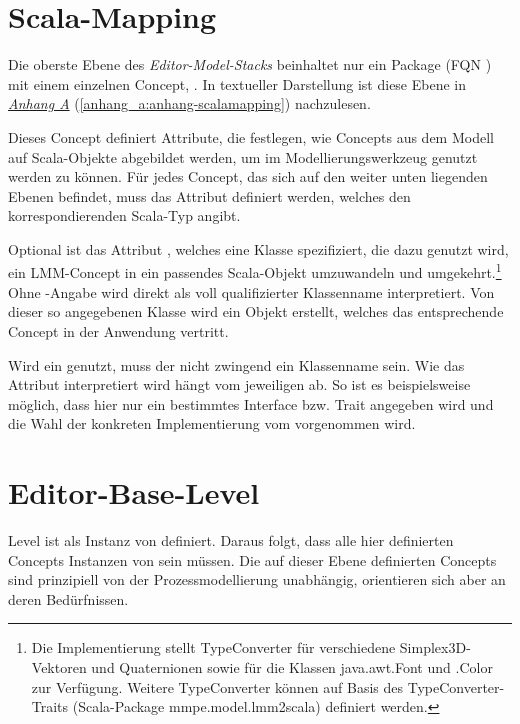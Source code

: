 \documentclass[a4paper,10pt]{sphinxmanual}
\begin{document}
\section{Scala-Mapping}
\label{metamodelle:scalamapping}\label{metamodelle:scala-mapping}
Die oberste Ebene des \emph{Editor-Model-Stacks} beinhaltet nur ein Package  (FQN ) mit einem einzelnen Concept, .
In textueller Darstellung ist diese Ebene in {\hyperref[anhang_a:anhang-scalamapping]{\emph{Anhang A}}} (\autoref*{anhang_a:anhang-scalamapping}) nachzulesen.

Dieses Concept definiert Attribute, die festlegen, wie Concepts aus dem Modell auf Scala-Objekte abgebildet werden, um im Modellierungswerkzeug genutzt werden zu können.
Für jedes Concept, das sich auf den weiter unten liegenden Ebenen befindet, muss das Attribut  definiert werden, welches den korrespondierenden Scala-Typ angibt.

Optional ist das Attribut , welches eine Klasse spezifiziert, die dazu genutzt wird, ein LMM-Concept in ein passendes Scala-Objekt umzuwandeln und umgekehrt.\footnote{
Die Implementierung stellt TypeConverter für verschiedene Simplex3D-Vektoren und Quaternionen sowie für die Klassen java.awt.Font und .Color zur Verfügung. Weitere TypeConverter können auf Basis des TypeConverter-Traits (Scala-Package mmpe.model.lmm2scala) definiert werden.
}
Ohne -Angabe wird  direkt als voll qualifizierter Klassenname interpretiert.
Von dieser so angegebenen Klasse wird ein Objekt erstellt, welches das entsprechende Concept in der Anwendung vertritt.

Wird ein  genutzt, muss der  nicht zwingend ein Klassenname sein.
Wie das Attribut interpretiert wird hängt vom jeweiligen  ab.
So ist es beispielsweise möglich, dass hier nur ein bestimmtes Interface bzw. Trait angegeben wird und die Wahl der konkreten Implementierung vom  vorgenommen wird.


\section{Editor-Base-Level}
\label{metamodelle:ebl}\label{metamodelle:editor-base-level}
Level  ist als Instanz von  definiert. Daraus folgt, dass alle hier definierten Concepts Instanzen von  sein müssen.
Die auf dieser Ebene definierten Concepts sind prinzipiell von der Prozessmodellierung unabhängig, orientieren sich aber an deren Bedürfnissen.
\end{document}

